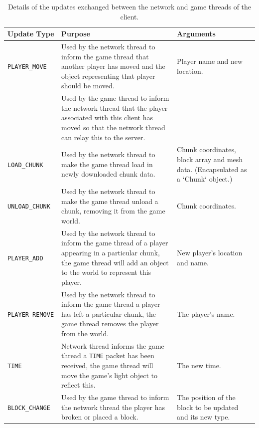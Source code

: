 \documentclass[12pt,notitlepage,a4paper]{report}
\begin{document}
	\begin{table}
		\begin{tabularx}{\textwidth}{| l | X | p{3cm} |}
			\hline
			\bf Update Type & Purpose & Arguments \\
			\hline
			\tt PLAYER\_MOVE & Used by the network thread to inform the game thread that another player has moved and the object representing that player should be moved. & Player name and new location.\\
			\cline{2-2}
			\tt & Used by the game thread to inform the network thread that the player associated with this client has moved so that the network thread can relay this to the server. & \\
			\hline
			\tt LOAD\_CHUNK & Used by the network thread to make the game thread load in newly downloaded chunk data. & Chunk coordinates, block array and mesh data. (Encapsulated as a `Chunk` object.) \\
			\hline
			\tt UNLOAD\_CHUNK & Used by the network thread to make the game thread unload a chunk, removing it from the game world. & Chunk coordinates. \\
			\hline
			\tt PLAYER\_ADD & Used by the network thread to inform the game thread of a player appearing in a particular chunk, the game thread will add an object to the world to represent this player. & New player's location and name. \\
			\hline
			\tt PLAYER\_REMOVE & Used by the network thread to inform the game thread a player has left a particular chunk, the game thread removes the player from the world. & The player's name. \\
			\hline
			\tt TIME & Network thread informs the game thread a \texttt{TIME} packet has been received, the game thread will move the game's light object to reflect this. & The new time. \\
			\hline
			\tt BLOCK\_CHANGE & Used by the game thread to inform the network thread the player has broken or placed a block. & The position of the block to be updated and its new type.\\
			\hline
		\end{tabularx}
		\caption{Details of the updates exchanged between the network and game threads of the client.}
		\label{tab:updates}
	\end{table}
	
\end{document}
